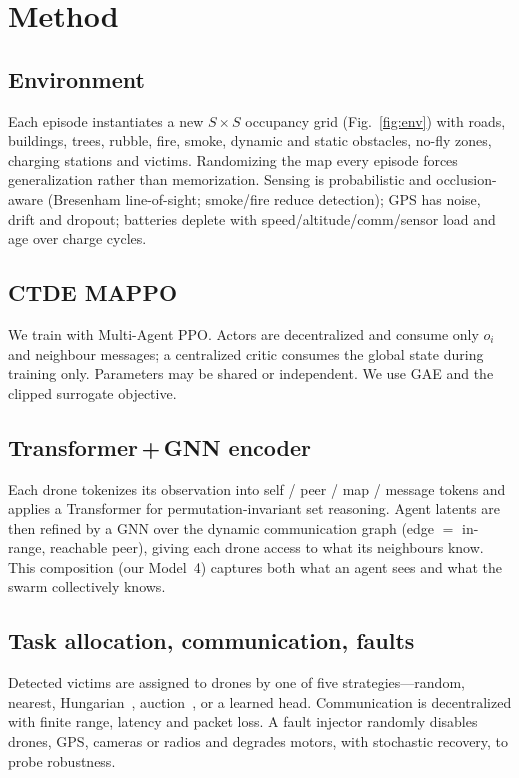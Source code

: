 \documentclass[conference]{IEEEtran}
\begin{document}
\section{Method}
\subsection{Environment}
Each episode instantiates a new $S\times S$ occupancy grid (Fig.~\ref{fig:env})
with roads, buildings, trees, rubble, fire, smoke, dynamic and static obstacles,
no-fly zones, charging stations and victims. Randomizing the map every episode
forces generalization rather than memorization. Sensing is probabilistic and
occlusion-aware (Bresenham line-of-sight; smoke/fire reduce detection); GPS has
noise, drift and dropout; batteries deplete with speed/altitude/comm/sensor load
and age over charge cycles.

\subsection{CTDE MAPPO}
We train with Multi-Agent PPO. Actors are decentralized and consume only $o_i$ and
neighbour messages; a centralized critic consumes the global state during training
only. Parameters may be shared or independent. We use GAE and the clipped
surrogate objective.

\subsection{Transformer\,+\,GNN encoder}
Each drone tokenizes its observation into self / peer / map / message tokens and
applies a Transformer for permutation-invariant set reasoning. Agent latents are
then refined by a GNN over the dynamic communication graph (edge $=$ in-range,
reachable peer), giving each drone access to what its neighbours know. This
composition (our Model~4) captures both what an agent sees and what the swarm
collectively knows.

\subsection{Task allocation, communication, faults}
Detected victims are assigned to drones by one of five strategies---random,
nearest, Hungarian~\cite{kuhn1955hungarian}, auction~\cite{bertsekas1988auction},
or a learned head. Communication is decentralized with finite range, latency and
packet loss. A fault injector randomly disables drones, GPS, cameras or radios and
degrades motors, with stochastic recovery, to probe robustness.
\end{document}
